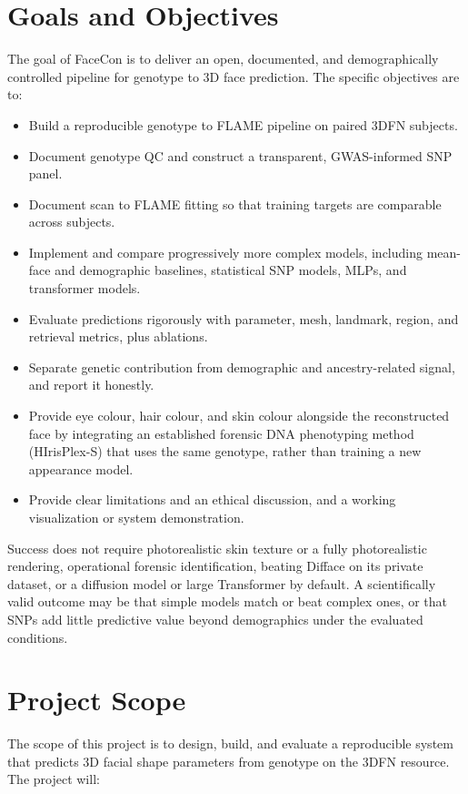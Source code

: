 \section{Goals and Objectives}
\label{sec:goals}
The goal of FaceCon is to deliver an open, documented, and demographically controlled pipeline for genotype to 3D face prediction. The specific objectives are to:

\begin{itemize}
\item Build a reproducible genotype to FLAME pipeline on paired 3DFN subjects.
\item Document genotype QC and construct a transparent, GWAS-informed SNP panel.
\item Document scan to FLAME fitting so that training targets are comparable across subjects.
\item Implement and compare progressively more complex models, including mean-face and demographic baselines, statistical SNP models, MLPs, and transformer models.
\item Evaluate predictions rigorously with parameter, mesh, landmark, region, and retrieval metrics, plus ablations.
\item Separate genetic contribution from demographic and ancestry-related signal, and report it honestly.
\item Provide eye colour, hair colour, and skin colour alongside the reconstructed face by integrating an established forensic DNA phenotyping method (HIrisPlex-S) that uses the same genotype, rather than training a new appearance model.
\item Provide clear limitations and an ethical discussion, and a working visualization or system demonstration.
\end{itemize}

Success does not require photorealistic skin texture or a fully photorealistic rendering, operational forensic identification, beating Difface on its private dataset, or a diffusion model or large Transformer by default. A scientifically valid outcome may be that simple models match or beat complex ones, or that SNPs add little predictive value beyond demographics under the evaluated conditions.

\section{Project Scope}
The scope of this project is to design, build, and evaluate a reproducible system that predicts 3D facial shape parameters from genotype on the 3DFN resource. The project will:

